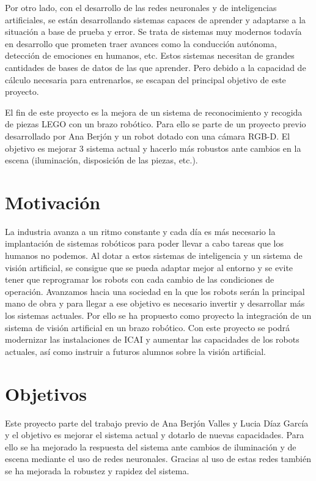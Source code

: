 Por otro lado, con el desarrollo de las redes neuronales y de inteligencias artificiales, se están desarrollando sistemas capaces de aprender y adaptarse a la situación a base de prueba y error. Se trata de sistemas muy modernos todavía en desarrollo que prometen traer avances como la conducción autónoma, detección de emociones en humanos, etc. Estos sistemas necesitan de grandes cantidades de bases de datos de las que aprender. Pero debido a la capacidad de cálculo necesaria para entrenarlos, se escapan del principal objetivo de este proyecto.

El fin de este proyecto es la mejora de un sistema de reconocimiento y recogida de piezas LEGO con un brazo robótico. Para ello se parte de un proyecto previo desarrollado por Ana Berjón \cite{TFGAna} y un robot dotado con una cámara RGB-D. El objetivo es mejorar 3 sistema actual y hacerlo más robustos ante cambios en la escena (iluminación, disposición de las piezas, etc.).

\section{Motivación}
\label{sec:Motivación}
La industria avanza a un ritmo constante y cada día es más necesario la implantación de sistemas robóticos para poder llevar a cabo tareas que los humanos no podemos. Al dotar a estos sistemas de inteligencia y un sistema de visión artificial, se consigue que se pueda adaptar mejor al entorno y se evite tener que reprogramar los robots con cada cambio de las condiciones de operación. Avanzamos hacia una sociedad en la que los robots serán la principal mano de obra y para llegar a ese objetivo es necesario invertir y desarrollar más los sistemas actuales. Por ello se ha propuesto como proyecto la integración de un sistema de visión artificial en un brazo robótico. Con este proyecto se podrá modernizar las instalaciones de ICAI y aumentar las capacidades de los robots actuales, así como instruir a futuros alumnos sobre la visión artificial.


\section{Objetivos}
\label{sec:Objetivos}
Este proyecto parte del trabajo previo de Ana Berjón Valles y Lucia Díaz García y el objetivo es mejorar el sistema actual y dotarlo de nuevas capacidades. Para ello se ha mejorado la respuesta del sistema ante cambios de iluminación y de escena mediante el uso de redes neuronales. Gracias al uso de estas redes también se ha mejorada la robustez y rapidez del sistema.

